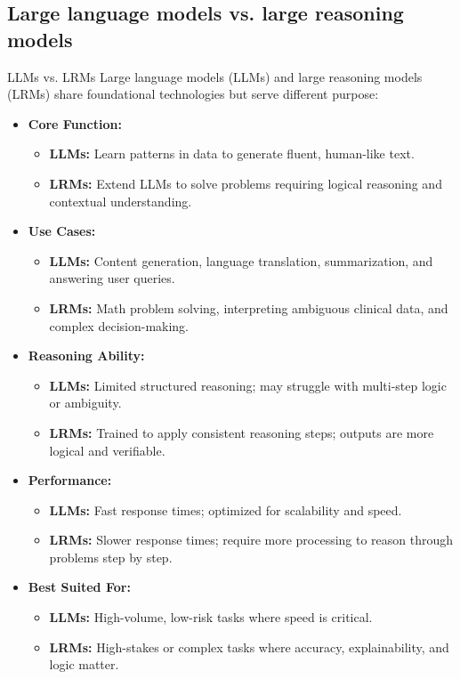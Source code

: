 \subsection{Large language models vs. large reasoning models}
\begin{frame}[allowframebreaks]{LLMs vs. LRMs}
    \large Large language models (LLMs) and large reasoning models (LRMs) share foundational technologies but serve different purpose:
    \vspace{0.5em}
    \begin{itemize}
        \item \textbf{Core Function:}
        \begin{itemize}
            \item \textbf{LLMs:} Learn patterns in data to generate fluent, human-like text.
            \item \textbf{LRMs:} Extend LLMs to solve problems requiring logical reasoning and contextual understanding.
        \end{itemize}
        \item \textbf{Use Cases:}
        \begin{itemize}
            \item \textbf{LLMs:} Content generation, language translation, summarization, and answering user queries.
            \item \textbf{LRMs:} Math problem solving, interpreting ambiguous clinical data, and complex decision-making.
        \end{itemize}
    \framebreak
        \item \textbf{Reasoning Ability:}
        \begin{itemize}
            \item \textbf{LLMs:} Limited structured reasoning; may struggle with multi-step logic or ambiguity.
            \item \textbf{LRMs:} Trained to apply consistent reasoning steps; outputs are more logical and verifiable.
        \end{itemize}
        \item \textbf{Performance:}
        \begin{itemize}
            \item \textbf{LLMs:} Fast response times; optimized for scalability and speed.
            \item \textbf{LRMs:} Slower response times; require more processing to reason through problems step by step.
        \end{itemize}
        \item \textbf{Best Suited For:}
        \begin{itemize}
            \item \textbf{LLMs:} High-volume, low-risk tasks where speed is critical.
            \item \textbf{LRMs:} High-stakes or complex tasks where accuracy, explainability, and logic matter.
        \end{itemize}
    \end{itemize}
\end{frame}


